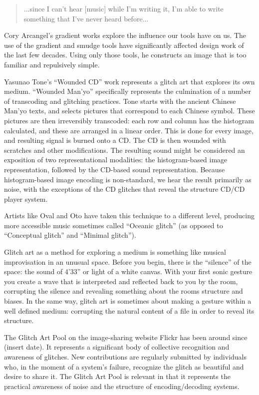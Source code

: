 \documentclass{thesis}
\begin{document}
\begin{quote}
...since I can't hear [music] while I'm writing it, I'm able to write something that I've never heard before...
\end{quote}

	Cory Arcangel's gradient works\cite{cory_arcangel_photoshop_2009} explore the influence our tools have on us. The use of the gradient and smudge tools have significantly affected design work of the last few decades. Using only those tools, he constructs an image that is too familiar and repulsively simple.
	
	Yasunao Tone's ``Wounded CD''\cite{media_art_net_media_2010} work represents a glitch art that explores its own medium. ``Wounded Man'yo'' specifically represents the culmination of a number of transcoding and glitching practices. Tone starts with the ancient Chinese Man'yo texts, and selects pictures that correspond to each Chinese symbol. These pictures are then irreversibly transcoded: each row and column has the histogram calculated, and these are arranged in a linear order. This is done for every image, and resulting signal is burned onto a CD. The CD is then wounded with scratches and other modifications. The resulting sound might be considered an exposition of two representational modalities: the histogram-based image representation, followed by the CD-based sound representation. Because histogram-based image encoding is non-standard, we hear the result primarily as noise, with the exceptions of the CD glitches that reveal the structure CD/CD player system.
	
	Artists like Oval and Oto have taken this technique to a different level, producing more accessible music sometimes called ``Oceanic glitch'' (as opposed to ``Conceptual glitch'' and ``Minimal glitch'').\cite{Sangild04}
	
	Glitch art as a method for exploring a medium is something like musical improvisation in an unusual space. Before you begin, there is the ``silence'' of the space: the sound of 4'33'' or light of a white canvas. With your first sonic gesture you create a wave that is interpreted and reflected back to you by the room, corrupting the silence and revealing something about the rooms structure and biases. In the same way, glitch art is sometimes about making a gesture within a well defined medium: corrupting the natural content of a file in order to reveal its structure.
	
	The Glitch Art Pool\cite{liminalmike_flickr:glitch_????} on the image-sharing website Flickr has been around since (insert date). It represents a significant body of collective recognition and awareness of glitches. New contributions are regularly submitted by individuals who, in the moment of a system's failure, recognize the glitch as beautiful and desire to share it. The Glitch Art Pool is relevant in that it represents the practical awareness of noise and the structure of encoding/decoding systems.
	
\end{document}
